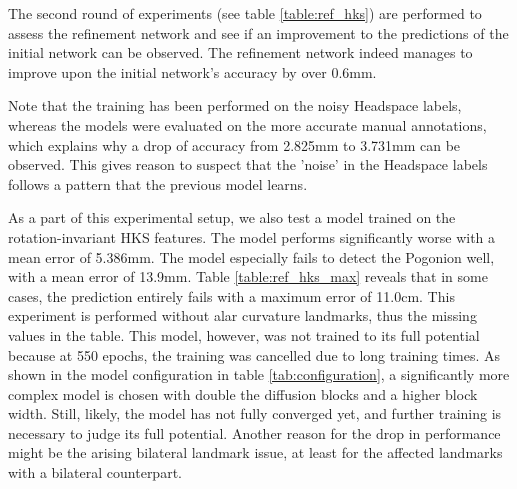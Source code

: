 \documentclass[class=article, crop=false]{standalone}
\begin{document}
The second round of experiments (see table \ref{table:ref_hks}) are performed to assess the refinement network and see if an improvement to the predictions of the initial network can be observed. The refinement network indeed manages to improve upon the initial network's accuracy by over 0.6mm. 

Note that the training has been performed on the noisy Headspace labels, whereas the models were evaluated on the more accurate manual annotations, which explains why a drop of accuracy from 2.825mm to 3.731mm can be observed. This gives reason to suspect that the 'noise' in the Headspace labels follows a pattern that the previous model learns.

As a part of this experimental setup, we also test a model trained on the rotation-invariant HKS features. The model performs significantly worse with a mean error of 5.386mm. The model especially fails to detect the Pogonion well, with a mean error of 13.9mm. Table \ref{table:ref_hks_max} reveals that in some cases, the prediction entirely fails with a maximum error of 11.0cm. This experiment is performed without alar curvature landmarks, thus the missing values in the table. This model, however, was not trained to its full potential because at 550 epochs, the training was cancelled due to long training times. As shown in the model configuration in table \ref{tab:configuration}, a significantly more complex model is chosen with double the diffusion blocks and a higher block width. Still, likely, the model has not fully converged yet, and further training is necessary to judge its full potential. Another reason for the drop in performance might be the arising bilateral landmark issue, at least for the affected landmarks with a bilateral counterpart. 
\end{document}
